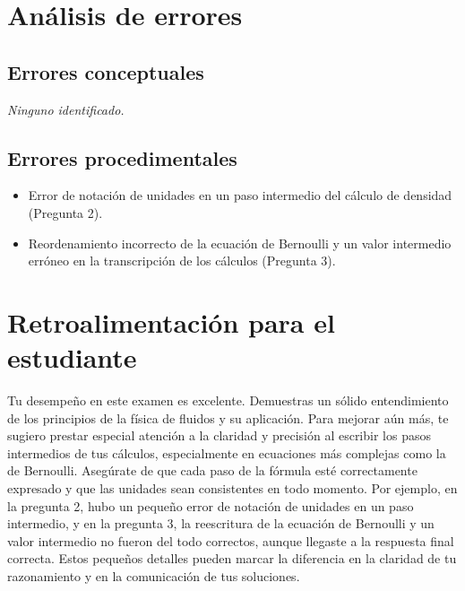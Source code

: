 \documentclass[11pt,a4paper]{article}
\begin{document}
\section*{Análisis de errores}

\subsection*{Errores conceptuales}
\textit{Ninguno identificado.}

\subsection*{Errores procedimentales}
\begin{itemize}[leftmargin=1.5em, itemsep=2pt]
  \item Error de notación de unidades en un paso intermedio del cálculo de densidad (Pregunta 2).
  \item Reordenamiento incorrecto de la ecuación de Bernoulli y un valor intermedio erróneo en la transcripción de los cálculos (Pregunta 3).
\end{itemize}

\section*{Retroalimentación para el estudiante}
\begin{tcolorbox}[cajaRecomendacion, title={Dirigido a: daniebsys ramos 34254529}]
Tu desempeño en este examen es excelente. Demuestras un sólido entendimiento de los principios de la física de fluidos y su aplicación. Para mejorar aún más, te sugiero prestar especial atención a la claridad y precisión al escribir los pasos intermedios de tus cálculos, especialmente en ecuaciones más complejas como la de Bernoulli. Asegúrate de que cada paso de la fórmula esté correctamente expresado y que las unidades sean consistentes en todo momento. Por ejemplo, en la pregunta 2, hubo un pequeño error de notación de unidades en un paso intermedio, y en la pregunta 3, la reescritura de la ecuación de Bernoulli y un valor intermedio no fueron del todo correctos, aunque llegaste a la respuesta final correcta. Estos pequeños detalles pueden marcar la diferencia en la claridad de tu razonamiento y en la comunicación de tus soluciones.
\end{tcolorbox}
\end{document}
